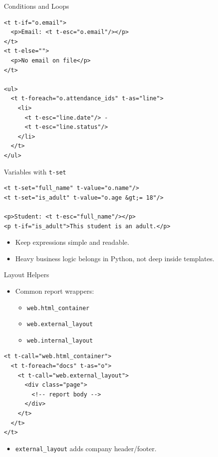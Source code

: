 \begin{frame}[fragile]{Conditions and Loops}
\begin{lstlisting}[style=xml]
<t t-if="o.email">
  <p>Email: <t t-esc="o.email"/></p>
</t>
<t t-else="">
  <p>No email on file</p>
</t>

<ul>
  <t t-foreach="o.attendance_ids" t-as="line">
	<li>
	  <t t-esc="line.date"/> -
	  <t t-esc="line.status"/>
	</li>
  </t>
</ul>
\end{lstlisting}
\end{frame}

\begin{frame}[fragile]{Variables with \texttt{t-set}}
\begin{lstlisting}[style=xml]
<t t-set="full_name" t-value="o.name"/>
<t t-set="is_adult" t-value="o.age &gt;= 18"/>

<p>Student: <t t-esc="full_name"/></p>
<p t-if="is_adult">This student is an adult.</p>
\end{lstlisting}
	\begin{itemize}
		\item Keep expressions simple and readable.
		\item Heavy business logic belongs in Python, not deep inside templates.
	\end{itemize}
\end{frame}

\begin{frame}[fragile]{Layout Helpers}
	\begin{itemize}
		\item Common report wrappers:
		\begin{itemize}
			\item \texttt{web.html\_container}
			\item \texttt{web.external\_layout}
			\item \texttt{web.internal\_layout}
		\end{itemize}
	\end{itemize}
\begin{lstlisting}[style=xml]
<t t-call="web.html_container">
  <t t-foreach="docs" t-as="o">
	<t t-call="web.external_layout">
	  <div class="page">
		<!-- report body -->
	  </div>
	</t>
  </t>
</t>
\end{lstlisting}
	\begin{itemize}
		\item \texttt{external\_layout} adds company header/footer.
	\end{itemize}
\end{frame}

